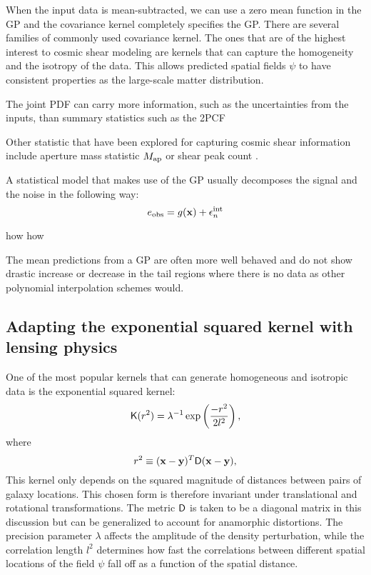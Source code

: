 When the input data is mean-subtracted, we can use a zero mean function in the
GP and the covariance kernel completely specifies the GP. 
There are several families of commonly used covariance kernel.
The ones that are of the highest interest to cosmic shear modeling 
are kernels that can capture 
the homogeneity and the isotropy of the data. This allows predicted spatial fields
$\psi$ to have consistent properties as the large-scale matter distribution.

The joint PDF can carry more information,
such as the uncertainties from the inputs, 
than summary statistics such as the 2PCF  



Other statistic that have been explored for capturing cosmic shear information
include aperture mass statistic $M_{\rm ap}$ or shear peak count \citep{Bard2014}.

A statistical model that makes use of the GP usually decomposes 
the signal and the noise in the following way: 
\begin{equation}
	e_{\rm obs} = g(\mathbf{x}) + \epsilon_n^{\rm int}  
\end{equation}

how how  


The mean predictions from a GP are
often more well behaved and do not show drastic increase or decrease 
in the tail regions where there is no data as other polynomial interpolation schemes 
would.  



\subsection{Adapting the exponential squared kernel with lensing physics}
One of the most popular kernels that can generate homogeneous and
isotropic data is the exponential squared kernel: 
\begin{equation}
	\mathsf{K}(r^2) = \lambda^{-1} \exp\left(\frac{-r^2}{2 l^2}\right),
	\label{eq:exp_sq_kernel}
\end{equation}
where 
\begin{equation}
	r^2 \equiv (\mathbf{x} - \mathbf{y})^T \mathsf{D} (\mathbf{x} - \mathbf{y}), 
\end{equation}
This kernel only depends on the
squared magnitude of distances between pairs of galaxy locations. 
This chosen form is therefore invariant
under translational and rotational transformations.
The metric $\mathsf{D}$ is taken to be a diagonal matrix in this discussion but  
can be generalized to account for anamorphic distortions. 
The precision parameter $\lambda$ affects the 
amplitude of the density perturbation, while the correlation length $l^2$ 
determines how fast the correlations between different spatial locations of the
field $\psi$ fall off as a function of the spatial distance.


